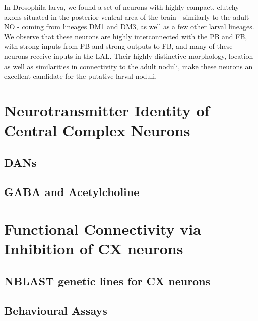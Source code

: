 In Drosophila larva, we found a set of neurons with highly compact, clutchy axons situated in the posterior ventral area of the brain - similarly to the adult NO - coming from lineages DM1 and DM3, as well as a few other larval lineages. We observe that these neurons are highly interconnected with the PB and FB,  with strong inputs from 
PB and strong outputs to FB, and many of these neurons receive inputs in the LAL.
Their highly distinctive morphology, location as well as similarities in connectivity to the adult noduli, make these neurons an excellent candidate for the putative larval noduli.



\section{Neurotransmitter Identity of Central Complex Neurons}
\subsection*{DANs}
\subsection*{GABA and Acetylcholine}


\section{Functional Connectivity via Inhibition of CX neurons}
\subsection*{NBLAST genetic lines for CX neurons}
\subsection*{Behavioural Assays}





